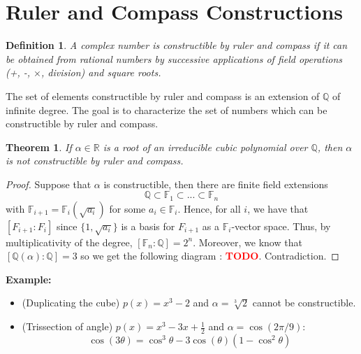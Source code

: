 \documentclass{article}
\newtheorem*{theorem}{Theorem}
\newtheorem*{definition}{Definition}
\newcommand{\R}{\mathbb{R}}
\newcommand{\Q}{\mathbb{Q}}
\newcommand{\F}{\mathbb{F}}
\newcommand{\td}{\textcolor{red}{\textbf{TODO}}}
\newenvironment{example}{\noindent\textbf{Example:} \vspace{-0.2cm}\begin{itemize}}{\end{itemize}}
\begin{document}
\section{Ruler and Compass Constructions}

\begin{definition}
    A complex number is constructible by ruler and compass if it can be obtained from rational numbers by successive applications of field operations (+, -, $\times$, division) and square roots.
\end{definition}

The set of elements constructible by ruler and compass is an extension of $\Q$ of infinite degree. The goal is to characterize the set of numbers which can be constructible by ruler and compass.

\begin{theorem}
    If $\alpha \in \R$ is a root of an irreducible cubic polynomial over $\Q$, then $\alpha$ is not constructible by ruler and compass.
\end{theorem}

\begin{proof}
    Suppose that $\alpha$ is constructible, then there are finite field extensions 
    $$\Q \subset \F_1 \subset ... \subset \F_n$$
    with $\F_{i+1} = \F_i(\sqrt{a_i})$ for some $a_i \in \F_i$. Hence, for all $i$, we have that $[F_{i+1} : F_i]$ since $\{1, \sqrt{a_i}\}$ is a basis for $F_{i+1}$ as a $\F_i$-vector space. Thus, by multiplicativity of the degree, $[\F_n : \Q] = 2^n$. Moreover, we know that $[\Q(\alpha) : \Q] = 3$ so we get the following diagram : \td. Contradiction.
\end{proof}

\begin{example}
    \item (Duplicating the cube) $p(x) = x^3 - 2$ and $\alpha = \sqrt[3]{2}$ cannot be constructible.
    \item (Trissection of angle) $p(x) = x^3 - 3x + \frac{1}{2}$ and $\alpha = \cos(2\pi/9)$:
    $$\cos(3\theta) = \cos^3 \theta - 3\cos(\theta)(1 - \cos^2\theta)$$
\end{example}
\end{document}
